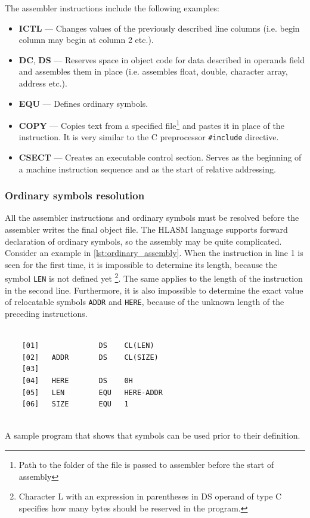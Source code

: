 The assembler instructions include the following examples:
\begin{itemize}
	\item \textbf{ICTL} --- Changes values of the previously described line columns (i.e. begin column may begin at column 2 etc.).
	
	\item \textbf{DC}, \textbf{DS} --- Reserves space in object code for data described in operands field and assembles them in place (i.e. assembles float, double, character array, address etc.).
	
	\item \textbf{EQU} --- Defines ordinary symbols.
	
	\item \textbf{COPY} --- Copies text from a specified file\footnote{Path to the folder of the file is passed to assembler before the start of assembly} and pastes it in place of the instruction. It is very similar to the C preprocessor \texttt{\#include} directive.
	
	\item \textbf{CSECT} --- Creates an executable control section. Serves as the beginning of a machine instruction sequence and as the start of relative addressing.
\end{itemize}

\subsubsection{Ordinary symbols resolution}

All the assembler instructions and ordinary symbols must be resolved before the assembler writes the final object file. The HLASM language supports forward declaration of ordinary symbols, so the assembly may be quite complicated. Consider an example in \cref{lst:ordinary_assembly}. When the instruction in line 1 is seen for the first time, it is impossible to determine its length, because the symbol \verb|LEN| is not defined yet \footnote{Character L with an expression in parentheses in DS operand of type C specifies how many bytes should be reserved in the program.}. The same applies to the length of the instruction in the second line. Furthermore, it is also impossible to determine the exact value of relocatable symbols \verb|ADDR| and \verb|HERE|, because of the unknown length of the preceding instructions.

\begin{listing}[t]
	\begin{verbatim}
	
	[01]              DS    CL(LEN)
	[02]   ADDR       DS    CL(SIZE)
	[03]
	[04]   HERE       DS    0H
	[05]   LEN        EQU   HERE-ADDR
	[06]   SIZE       EQU   1
	
	\end{verbatim}
	\caption{A sample program that shows that symbols can be used prior to their definition.}
	\label{lst:ordinary_assembly}
\end{listing}


